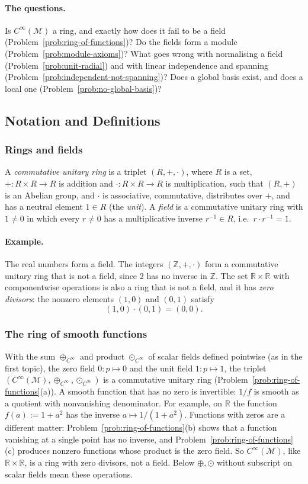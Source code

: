 \documentclass[11pt]{article}
\newcommand{\Cinf}{C^\infty(\mathcal M)}
\begin{document}
\paragraph{The questions.}
Is $\Cinf$ a ring, and exactly how does it fail to be a field (Problem~\ref{prob:ring-of-functions})? Do the fields form a module (Problem~\ref{prob:module-axioms})? What goes wrong with normalising a field (Problem~\ref{prob:unit-radial}) and with linear independence and spanning (Problem~\ref{prob:independent-not-spanning})? Does a global basis exist, and does a local one (Problem~\ref{prob:no-global-basis})?

\subsection*{Notation and Definitions}

\subsubsection*{Rings and fields}
A \emph{commutative unitary ring} is a triplet $(R,+,\cdot)$, where $R$ is a set, $+:R\times R\to R$ is addition and $\cdot:R\times R\to R$ is multiplication, such that $(R,+)$ is an Abelian group, and $\cdot$ is associative, commutative, distributes over $+$, and has a neutral element $1\in R$ (the \emph{unit}). A \emph{field} is a commutative unitary ring with $1\neq0$ in which every $r\neq0$ has a multiplicative inverse $r^{-1}\in R$, i.e.\ $r\cdot r^{-1}=1$.

\paragraph{Example.} The real numbers form a field. The integers $(\mathbb Z,+,\cdot)$ form a commutative unitary ring that is not a field, since $2$ has no inverse in $\mathbb Z$. The set $\mathbb R\times\mathbb R$ with componentwise operations is also a ring that is not a field, and it has \emph{zero divisors}: the nonzero elements $(1,0)$ and $(0,1)$ satisfy
\[
(1,0)\cdot(0,1)=(0,0).
\]

\subsubsection*{The ring of smooth functions}
With the sum $\oplus_{C^\infty}$ and product $\odot_{C^\infty}$ of scalar fields defined pointwise (as in the first topic), the zero field $0:p\mapsto0$ and the unit field $1:p\mapsto1$, the triplet $(\Cinf,\oplus_{C^\infty},\odot_{C^\infty})$ is a commutative unitary ring (Problem~\ref{prob:ring-of-functions}(a)). A smooth function that has no zero is invertible: $1/f$ is smooth as a quotient with nonvanishing denominator. For example, on $\mathbb R$ the function $f(a):=1+a^2$ has the inverse $a\mapsto1/(1+a^2)$. Functions with zeros are a different matter: Problem~\ref{prob:ring-of-functions}(b) shows that a function vanishing at a single point has no inverse, and Problem~\ref{prob:ring-of-functions}(c) produces nonzero functions whose product is the zero field. So $\Cinf$, like $\mathbb R\times\mathbb R$, is a ring with zero divisors, not a field. Below $\oplus,\odot$ without subscript on scalar fields mean these operations.
\end{document}
